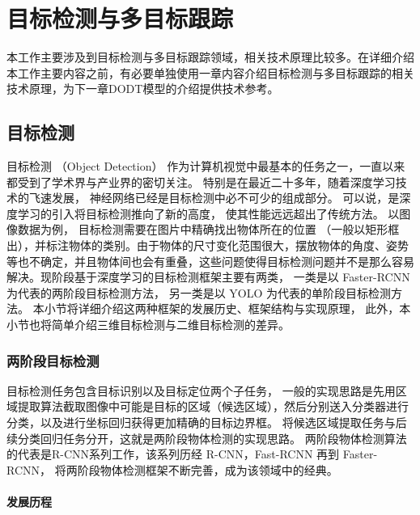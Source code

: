 \chapter{目标检测与多目标跟踪}
\label{technologies}
本工作主要涉及到目标检测与多目标跟踪领域，相关技术原理比较多。在详细介绍本工作主要内容之前，有必要单独使用一章内容介绍目标检测与多目标跟踪的相关技术原理，为下一章DODT模型的介绍提供技术参考。

\section{目标检测}
\label{object_detection}
目标检测 （Object Detection） 作为计算机视觉中最基本的任务之一，一直以来都受到了学术界与产业界的密切关注。 特别是在最近二十多年，随着深度学习技术的飞速发展， 神经网络已经是目标检测中必不可少的组成部分。 可以说，是深度学习的引入将目标检测推向了新的高度， 使其性能远远超出了传统方法。 以图像数据为例， 目标检测需要在图片中精确找出物体所在的位置 （一般以矩形框出），并标注物体的类别。由于物体的尺寸变化范围很大，摆放物体的角度、姿势等也不确定，并且物体间也会有重叠，这些问题使得目标检测问题并不是那么容易解决。现阶段基于深度学习的目标检测框架主要有两类， 一类是以 Faster-RCNN\cite{ren2015faster} 为代表的两阶段目标检测方法， 另一类是以 YOLO\cite{redmon2016you} 为代表的单阶段目标检测方法。 本小节将详细介绍这两种框架的发展历史、框架结构与实现原理， 此外，本小节也将简单介绍三维目标检测与二维目标检测的差异。

\subsection{两阶段目标检测}
\label{two-stage}
目标检测任务包含目标识别以及目标定位两个子任务， 一般的实现思路是先用区域提取算法截取图像中可能是目标的区域（候选区域），然后分别送入分类器进行分类，以及进行坐标回归获得更加精确的目标边界框。 将候选区域提取任务与后续分类回归任务分开，这就是两阶段物体检测的实现思路。 两阶段物体检测算法的代表是R-CNN系列工作，该系列历经 R-CNN\cite{6909475}，Fast-RCNN\cite{girshick2015fast} 再到 Faster-RCNN\cite{ren2015faster}， 将两阶段物体检测框架不断完善，成为该领域中的经典。 

\subsubsection{发展历程}




